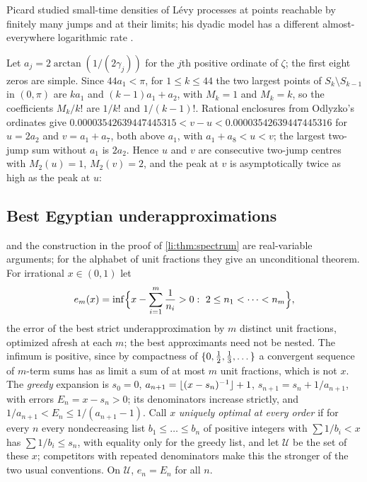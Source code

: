 Picard studied small-time densities
of L\'evy processes at points reachable by finitely many jumps and at their limits; his dyadic model
has a different almost-everywhere logarithmic rate \cite{Picard1997Density,Picard1997Accessible}.

\begin{example}\label{li:ex:zetapeaks}
Let $a_j=2\arctan(1/(2\gamma_j))$ for the $j$th positive ordinate of $\zeta$; the first eight zeros are simple.
Since $44a_1<\pi$, for $1\le k\le44$ the two largest points of $S_k\setminus S_{k-1}$ in $(0,\pi)$ are $ka_1$ and
$(k-1)a_1+a_2$, with $M_k=1$ and $M_k=k$, so the coefficients $M_k/k!$ are $1/k!$ and $1/(k-1)!$. Rational
enclosures from Odlyzko's ordinates give $0.00003542639447445315<v-u<0.00003542639447445316$ for $u=2a_2$ and
$v=a_1+a_7$, both above $a_1$,
with $a_1+a_8<u<v$; the largest two-jump sum without $a_1$ is $2a_2$. Hence $u$ and $v$ are consecutive
two-jump centres with $M_2(u)=1$, $M_2(v)=2$, and the peak at $v$ is asymptotically twice as high as the
peak at $u$:
\begin{center}
\end{center}
\end{example}

\subsection{Best Egyptian underapproximations}\label{lih:sec:egypt}

 and the construction in the proof of \cref{li:thm:spectrum} are real-variable
arguments; for the alphabet of unit fractions they give an unconditional theorem. For irrational
$x\in(0,1)$ let
\[
 e_m(x)=\inf\Bigl\{x-\sum_{i=1}^m\frac1{n_i}>0:\ 2\le n_1<\dots<n_m\Bigr\},
\]
the error of the best strict underapproximation by $m$ distinct unit fractions, optimized afresh at
each $m$; the best approximants need not be nested. The infimum is positive, since by compactness of
$\{0,\frac12,\frac13,\dots\}$ a convergent sequence of $m$-term sums has as limit a sum of at most $m$ unit
fractions, which is not $x$. The \emph{greedy} expansion is $s_0=0$, $a_{n+1}=\lfloor(x-s_n)^{-1}\rfloor+1$,
$s_{n+1}=s_n+1/a_{n+1}$, with errors $E_n=x-s_n>0$; its denominators increase strictly, and
$1/a_{n+1}<E_n\le1/(a_{n+1}-1)$. Call $x$ \emph{uniquely optimal at every order} if for every $n$ every
nondecreasing list $b_1\le\dots\le b_n$ of positive integers with $\sum1/b_i<x$ has $\sum1/b_i\le s_n$, with equality
only for the greedy list, and let $\mathcal U$ be the set of these $x$; competitors with repeated
denominators make this the stronger of the two usual conventions. On $\mathcal U$, $e_n=E_n$ for all $n$.

